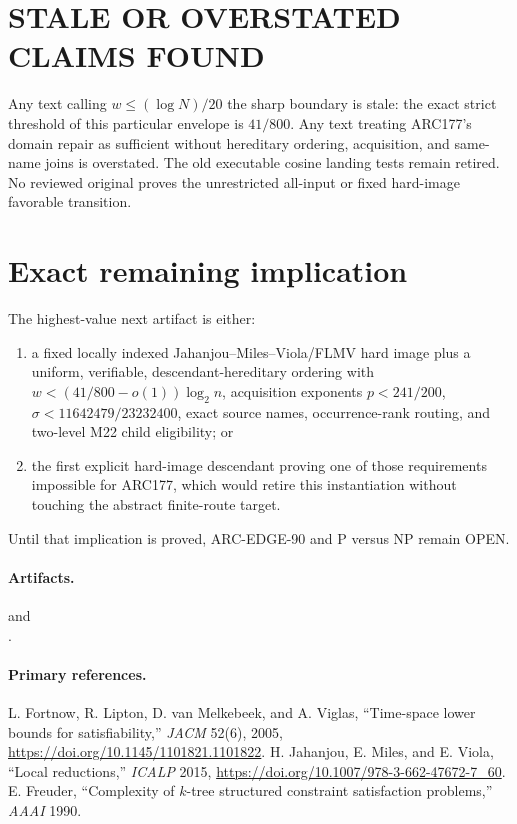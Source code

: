 \documentclass[11pt]{article}
\begin{document}
\section{STALE OR OVERSTATED CLAIMS FOUND}
Any text calling $w\le(\log N)/20$ the sharp boundary is stale: the exact
strict threshold of this particular envelope is $41/800$.  Any text treating
ARC177's domain repair as sufficient without hereditary ordering, acquisition,
and same-name joins is overstated.  The old executable cosine landing tests
remain retired.  No reviewed original proves the unrestricted all-input or
fixed hard-image favorable transition.

\section{Exact remaining implication}
The highest-value next artifact is either:
\begin{enumerate}
\item a fixed locally indexed Jahanjou--Miles--Viola/FLMV hard image plus a
uniform, verifiable, descendant-hereditary ordering with
$w<(41/800-o(1))\log_2n$, acquisition exponents
$p<241/200$, $\sigma<11642479/23232400$, exact source names, occurrence-rank
routing, and two-level M22 child eligibility; or
\item the first explicit hard-image descendant proving one of those
requirements impossible for ARC177, which would retire this instantiation
without touching the abstract finite-route target.
\end{enumerate}
Until that implication is proved, ARC-EDGE-90 and P versus NP remain OPEN.

\paragraph{Artifacts.}
 and\\
.

\paragraph{Primary references.}
L. Fortnow, R. Lipton, D. van Melkebeek, and A. Viglas,
``Time-space lower bounds for satisfiability,'' \emph{JACM} 52(6), 2005,
\url{https://doi.org/10.1145/1101821.1101822}.  H. Jahanjou, E. Miles, and
E. Viola, ``Local reductions,'' \emph{ICALP} 2015,
\url{https://doi.org/10.1007/978-3-662-47672-7_60}.  E. Freuder,
``Complexity of $k$-tree structured constraint satisfaction problems,''
\emph{AAAI} 1990.

\bigskip
\end{document}
